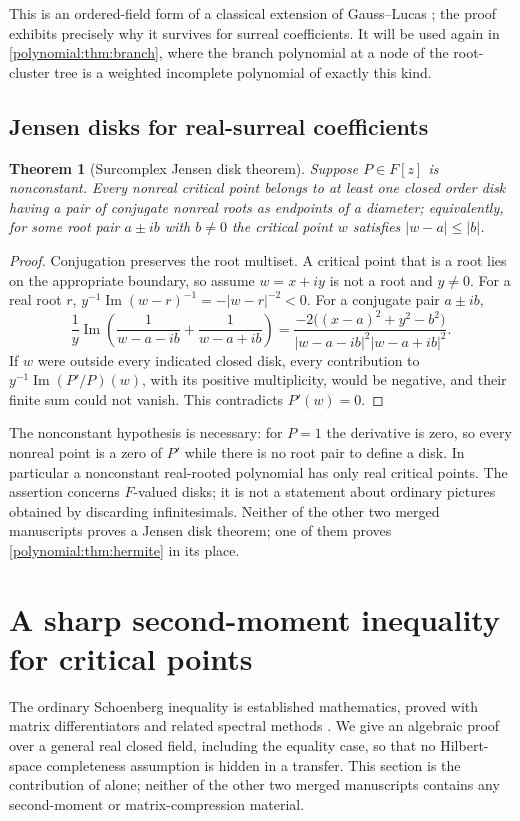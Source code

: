 \documentclass[11pt,letterpaper]{article}
\numberwithin{equation}{section}
\newtheorem{theorem}{Theorem}[section]
\theoremstyle{definition}
\theoremstyle{remark}\newtheorem{remark}[theorem]{Remark}
\begin{document}
This is an ordered-field form of a classical extension of Gauss--Lucas
\cite{polynomial:Zhang}; the proof exhibits precisely why it survives for
surreal coefficients. It will be used again in
\cref{polynomial:thm:branch}, where the branch polynomial at a node of the
root-cluster tree is a weighted incomplete polynomial of exactly this kind.

\subsection{Jensen disks for real-surreal coefficients}
\begin{theorem}[Surcomplex Jensen disk theorem]\label{polynomial:thm:jensen}
Suppose $P\in F[z]$ is nonconstant. Every nonreal critical point belongs to at least one
closed order disk having a pair of conjugate nonreal roots as endpoints of a
diameter; equivalently, for some root pair $a\pm ib$ with $b\ne0$ the critical
point $w$ satisfies $|w-a|\le|b|$.
\end{theorem}
\begin{proof}
Conjugation preserves the root multiset. A critical point that is a root lies
on the appropriate boundary, so assume $w=x+iy$ is not a root and $y\ne0$. For
a real root $r$, $y^{-1}\operatorname{Im}(w-r)^{-1}=-|w-r|^{-2}<0$. For a
conjugate pair $a\pm ib$,
\begin{equation}\label{polynomial:eq:jensencalc}
 \frac1y\operatorname{Im}\left(\frac1{w-a-ib}+\frac1{w-a+ib}\right)
 =\frac{-2\bigl((x-a)^2+y^2-b^2\bigr)}{|w-a-ib|^2|w-a+ib|^2}.
\end{equation}
If $w$ were outside every indicated closed disk, every contribution to
$y^{-1}\operatorname{Im}(P'/P)(w)$, with its positive multiplicity, would be
negative, and their finite sum could not vanish. This contradicts $P'(w)=0$.
\end{proof}

The nonconstant hypothesis is necessary: for $P=1$ the derivative is zero,
so every nonreal point is a zero of $P'$ while there is no root pair to define
a disk. In particular a nonconstant real-rooted polynomial has only real critical points. The
assertion concerns $F$-valued disks; it is not a statement about ordinary
pictures obtained by discarding infinitesimals. Neither of the other two
merged manuscripts proves a Jensen disk theorem; one of them proves
\cref{polynomial:thm:hermite} in its place.

\section{A sharp second-moment inequality for critical points}
\label{polynomial:sec:moment}
The ordinary Schoenberg inequality is established mathematics, proved with
matrix differentiators and related spectral methods
\cite{polynomial:Pereira,polynomial:KushelTyaglov}. We give an algebraic proof
over a general real closed field, including the equality case, so that no
Hilbert-space completeness assumption is hidden in a transfer. This section is
the contribution of \cite{polynomial:MsNewton} alone; neither of the other two
merged manuscripts contains any second-moment or matrix-compression material.
\end{document}
